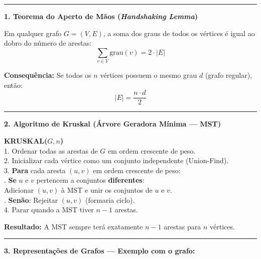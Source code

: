 \documentclass[12pt,a4paper]{article}
\begin{document}
\hrule
\vspace{0.4cm}

\noindent\textbf{1. Teorema do Aperto de Mãos (\textit{Handshaking Lemma})}

Em qualquer grafo $G = (V, E)$, a soma dos graus de todos os vértices é igual ao dobro do número de arestas:
$$\sum_{v \in V} \text{grau}(v) = 2 \cdot |E|$$

\textbf{Consequência:} Se todos os $n$ vértices possuem o mesmo grau $d$ (grafo regular), então:
$$|E| = \frac{n \cdot d}{2}$$

\vspace{0.4cm}
\hrule
\vspace{0.4cm}

\noindent\textbf{2. Algoritmo de Kruskal (Árvore Geradora Mínima — MST)}

\begin{tcolorbox}[colback=white, colframe=black, fontupper=\small]
\textbf{KRUSKAL($G, n$)}\\
1. Ordenar todas as arestas de $G$ em ordem crescente de peso.\\
2. Inicializar cada vértice como um conjunto independente (Union-Find).\\
3. \textbf{Para} cada aresta $(u, v)$ em ordem crescente de peso:\\
. \textbf{Se} $u$ e $v$ pertencem a conjuntos \textbf{diferentes}:\\
\quad\quad Adicionar $(u, v)$ à MST e unir os conjuntos de $u$ e $v$.\\
. \textbf{Senão}: Rejeitar $(u, v)$ (formaria ciclo).\\
4. Parar quando a MST tiver $n - 1$ arestas.
\end{tcolorbox}

\textbf{Resultado:} A MST sempre terá exatamente $n - 1$ arestas para $n$ vértices.

\vspace{0.4cm}
\hrule
\vspace{0.4cm}

\noindent\textbf{3. Representações de Grafos — Exemplo com o grafo:}

\begin{center}
\end{center}
\end{document}
